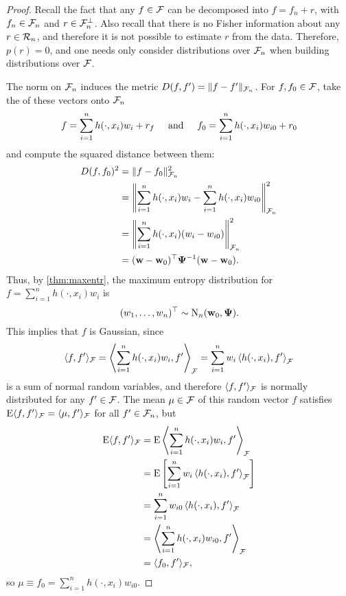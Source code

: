 \begin{proof}
  Recall the fact that any $f \in {\mathcal F}$ can be decomposed into $f = f_n + r$, with $f_n \in {\mathcal F}_n$ and $r \in {\mathcal F}_n^\bot$.
  Also recall that there is no Fisher information about any $r \in {\mathcal R}_n$, and therefore it is not possible to estimate $r$ from the data.
  Therefore, $p(r) = 0$, and one needs only consider distributions over ${\mathcal F}_n$ when building distributions over ${\mathcal F}$.
  
  The norm on ${\mathcal F}_n$ induces the metric $D(f,f') = \lVert f - f'\rVert_{{\mathcal F}_n}$.
  For $f,f_0 \in {\mathcal F}$, take the 
   of these vectors onto ${\mathcal F}_n$
  \[
    f = \sum_{i=1}^n h(\cdot,x_i)w_i + r_f
    \hspace{0.5cm}\text{and}\hspace{0.5cm}
    f_0 = \sum_{i=1}^n h(\cdot,x_i)w_{i0} + r_0
  \]
  and compute the squared distance between them:
  \begin{align*}
    D(f,f_0)^2 
    &= \lVert f - f_0\rVert_{{\mathcal F}_n}^2 \\
    &= \left\Vert \sum_{i=1}^n h(\cdot,x_i)w_i - \sum_{i=1}^n h(\cdot,x_i)w_{i0} \right\Vert_{{\mathcal F}_n}^2 \\
    &= \left\Vert \sum_{i=1}^n h(\cdot,x_i)(w_i - w_{i0}) \right\Vert_{{\mathcal F}_n}^2 \\
    &= ({\mathbf w} - {\mathbf w}_0)^\top{\bm\Psi}^{-1} ({\mathbf w} - {\mathbf w}_0).
  \end{align*}
  Thus, by \cref{thm:maxentr}, the maximum entropy distribution for $f = \sum_{i=1}^n h(\cdot,x_i)w_i$ is
  \[
    (w_1,\dots,w_n)^\top \sim \operatorname{N}_n({\mathbf w}_0,{\bm\Psi}).
  \]
  This implies that $f$ is Gaussian, since
  \begin{align*}
    \langle f,f' \rangle_{{\mathcal F}}
    = \left\langle \sum_{i=1}^n h(\cdot,x_i)w_i, f' \right\rangle_{{\mathcal F}} 
    = \sum_{i=1}^n w_i \left\langle  h(\cdot,x_i), f' \right\rangle_{{\mathcal F}}  
  \end{align*}
  is a sum of normal random variables, and therefore $\langle f,f' \rangle_{{\mathcal F}}$ is normally distributed for any $f' \in {\mathcal F}$.
  The mean $\mu\in{\mathcal F}$ of this random vector $f$ satisfies $\operatorname{E}\langle f,f'\rangle_{{\mathcal F}}  = \langle\mu,f'\rangle_{{\mathcal F}}$ for all $f'\in{\mathcal F}_n$, but
  \begin{align*}
    \operatorname{E}\langle f,f'\rangle_{{\mathcal F}}  
    &= \operatorname{E} \left\langle \sum_{i=1}^n h(\cdot,x_i)w_i, f' \right\rangle_{{\mathcal F}} \\
    &= \operatorname{E} \left[ \sum_{i=1}^n w_i \left\langle  h(\cdot,x_i), f' \right\rangle_{{\mathcal F}} \right] \\
    &= \sum_{i=1}^n w_{i0} \left\langle  h(\cdot,x_i), f' \right\rangle_{{\mathcal F}} \\
    &= \left\langle \sum_{i=1}^n h(\cdot,x_i)w_{i0}, f' \right\rangle_{{\mathcal F}} \\
    &= \langle f_0,f' \rangle_{{\mathcal F}},
  \end{align*}
  so $\mu \equiv f_0 = \sum_{i=1}^n h(\cdot,x_i)w_{i0}$. 
  

\end{proof}
